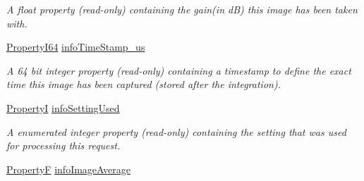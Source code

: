 \begin{DoxyCompactItemize}
\begin{DoxyCompactList}\small\item\em A float property {\bfseries }(read-\/only) containing the gain(in d\+B) this image has been taken with. \end{DoxyCompactList}\item 
\hyperlink{group___common_interface_ga81749b2696755513663492664a18a893}{Property\+I64} \hyperlink{classmv_i_m_p_a_c_t_1_1acquire_1_1_request_ac26005e19f53dc564e3c3763a1fccaee}{info\+Time\+Stamp\+\_\+us}
\begin{DoxyCompactList}\small\item\em A 64 bit integer property {\bfseries }(read-\/only) containing a timestamp to define the exact time this image has been captured (stored after the integration). \end{DoxyCompactList}\item 
\hyperlink{group___common_interface_ga12d5e434238ca242a1ba4c6c3ea45780}{Property\+I} \hyperlink{classmv_i_m_p_a_c_t_1_1acquire_1_1_request_a6bed2d106f7443c329eb3afa9d658af0}{info\+Setting\+Used}
\begin{DoxyCompactList}\small\item\em A enumerated integer property {\bfseries }(read-\/only) containing the setting that was used for processing this request. \end{DoxyCompactList}\item 
\hypertarget{classmv_i_m_p_a_c_t_1_1acquire_1_1_request_a1426e97c10c38d2a22c5dda70ac4fd42}{\hyperlink{group___common_interface_gaf54865fe5a3d5cfd15f9a111b40d09f9}{Property\+F} \hyperlink{classmv_i_m_p_a_c_t_1_1acquire_1_1_request_a1426e97c10c38d2a22c5dda70ac4fd42}{info\+Image\+Average}}\label{classmv_i_m_p_a_c_t_1_1acquire_1_1_request_a1426e97c10c38d2a22c5dda70ac4fd42}


\end{DoxyCompactItemize}
